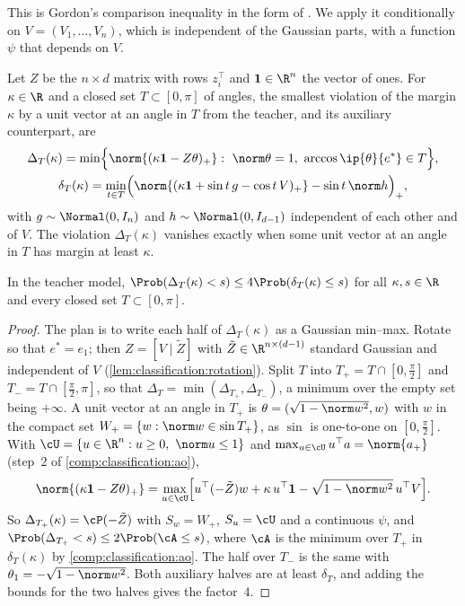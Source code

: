 \begin{refsection}
This is Gordon's comparison inequality \parencite{Gordon1985} in the form of \textcite[Theorem~6.1(i)]{ThrampoulidisAbbasiHassibi2018}. We apply it conditionally on $V=(V_1,\dots,V_n)$, which is independent of the Gaussian parts, with a function $\psi$ that depends on $V$.

Let $Z$ be the $n\times d$ matrix with rows $z_i^\top$ and $\classificationones\in\R^n$ the vector of ones. For $\kappa\in\R$ and a closed set $T\subset[0,\pi]$ of angles, the smallest violation of the margin $\kappa$ by a unit vector at an angle in $T$ from the teacher, and its auxiliary counterpart, are
\begin{gather*}
\Delta_T(\kappa)=\min\Bigl\{\norm{(\kappa\classificationones-Z\theta)_+}:\ \norm\theta=1,\ \arccos\ip{\theta}{e^*}\in T\Bigr\},\\
\delta_T(\kappa)=\min_{t\in T}\Bigl(\norm{(\kappa\classificationones+\sin t\,g-\cos t\,V)_+}-\sin t\,\norm h\Bigr)_+,
\end{gather*}
with $g\sim\Normal(0,I_n)$ and $h\sim\Normal(0,I_{d-1})$ independent of each other and of $V$. The violation $\Delta_T(\kappa)$ vanishes exactly when some unit vector at an angle in $T$ has margin at least $\kappa$.

\begin{lemma}\label{lem:classification:primal}
In the teacher model, $\Prob(\Delta_T(\kappa)<s)\le4\Prob(\delta_T(\kappa)\le s)$ for all $\kappa,s\in\R$ and every closed set $T\subset[0,\pi]$.
\end{lemma}

\begin{proof}
The plan is to write each half of $\Delta_T(\kappa)$ as a Gaussian min--max. Rotate so that $e^*=e_1$; then $Z=[V\mid\tilde Z]$ with $\tilde Z\in\R^{n\times(d-1)}$ standard Gaussian and independent of $V$ (\cref{lem:classification:rotation}). Split $T$ into $T_+=T\cap[0,\frac\pi2]$ and $T_-=T\cap[\frac\pi2,\pi]$, so that $\Delta_T=\min(\Delta_{T_+},\Delta_{T_-})$, a minimum over the empty set being $+\infty$. A unit vector at an angle in $T_+$ is $\theta=(\sqrt{1-\norm w^2},w)$ with $w$ in the compact set $W_+=\{w:\norm w\in\sin T_+\}$, as $\sin$ is one-to-one on $[0,\frac\pi2]$. With $\cU=\{u\in\R^n:u\ge0,\ \norm u\le1\}$ and $\max_{u\in\cU}u^\top a=\norm{a_+}$ (step~2 of \cref{comp:classification:ao}),
\[
\norm{(\kappa\classificationones-Z\theta)_+}=\max_{u\in\cU}\Bigl[u^\top(-\tilde Z)w+\kappa\,u^\top\classificationones-\sqrt{1-\norm w^2}\,u^\top V\Bigr].
\]
So $\Delta_{T_+}(\kappa)=\cP(-\tilde Z)$ with $S_w=W_+$, $S_u=\cU$ and a continuous $\psi$, and $\Prob(\Delta_{T_+}<s)\le2\Prob(\cA\le s)$, where $\cA$ is the minimum over $T_+$ in $\delta_T(\kappa)$ by \cref{comp:classification:ao}. The half over $T_-$ is the same with $\theta_1=-\sqrt{1-\norm w^2}$. Both auxiliary halves are at least $\delta_T$, and adding the bounds for the two halves gives the factor~$4$.
\end{proof}


\end{refsection}
